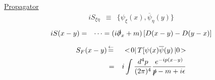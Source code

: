 \begin{comment}
Writing a quantized free Dirac field
corresponding to Eq. (\ref{eqn:DiracFieldClExpand}) as
\begin{equation}
\psi(x) 
=
\int \frac{d^3 \bld{p}}{\sqrt{(2\pi)^3} 2 p^0}
\sum_{s = \pm 1}
\left[
c(\bld{p}, s) u(\bld{p}, s) e^{-ipx}
+
d^\dagger(\bld{p}, s) v(\bld{p}, s) e^{ipx}
\right]
\end{equation}
creation and annihilation operators satisfy
\footnote{ %
\begin{eqnarray}
\{ \psi_\xi(t, \bld{x}), \psi_\eta^\dagger(t, \bld{y}) \}_+
&=&
\int \frac{d^3 \bld{p} d^3 \bld{p}'}{(2\pi)^3 4 E E'}
\sum_{\alpha, \beta} \left(
\{ c_\alpha(\bld{p}), c^\dagger_\beta(\bld{p}') \}
u^{(\alpha)}_\xi (\bld{p}) u^{(\beta) \dagger}_\eta (\bld{p}')
\right.
\nonumber\\
&&
\left.
+
\{ d^\dagger_\alpha(\bld{p}), d_\beta(\bld{p}') \}
v^{(\alpha)}_\xi (\bld{p}) v^{(\beta) \dagger}_\eta (\bld{p}')
\right)
\nonumber\\
&=& \dots
\nonumber\\
&=& 
\delta_{\xi \eta} \delta^3(\bld{x} - \bld{y})
\end{eqnarray}
}%




\end{comment}


\noindent
\underline{Propagator}\\
\begin{eqnarray}
i S_{\xi \eta} &\equiv&
\{
\psi_\xi (x) , \overline{\psi}_\eta (y) \}
\end{eqnarray}
\begin{eqnarray}
iS(x - y)
&=& 
\dots
=
(i \slashed{\partial}_x + m)
\left[
D(x-y) - D(y - x)
\right]
\end{eqnarray}

\begin{eqnarray}
S_F(x - y) &\,\mbox{$\stackrel{\leftarrow}{=}$}\,&
<\! 0 |\, T[ \psi(x) \overline{\psi}(y) \,| 0 \!>
\\
&=&
i \int \frac{d^4 p}{(2\pi)^4}
\frac{e^{-ip(x-y)}}{\slashed{p} - m + i\epsilon}
\end{eqnarray}
\begin{comment}
\begin{eqnarray}
S_F(q) &=& i \int d^4x e^{iqx}
\bra 0 \braend T[\psi(x) \bar{\psi}(0)]
\ketend 0 \ket
\nonumber\\
&=&
\frac{-1}{\slashed{q} - m + i \epsilon}
=
- \frac{\slashed{q} + m}{ q^2 - m^2 + i \epsilon}
\end{eqnarray}
\end{comment}

